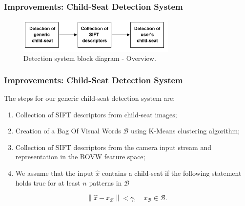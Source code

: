 \documentclass{beamer}
\newcommand{\norm}[1]{\left\lVert#1\right\rVert}
\begin{document}
	\begin{frame}
		\frametitle{Improvements: Child-Seat Detection System}
		\begin{figure}
			\centering
			\includegraphics[width=0.7\textwidth]{img/SIFT_collection.png}
			\caption{Detection system block diagram - Overview.}
		\end{figure}
	\end{frame}

	\begin{frame}
		\frametitle{Improvements: Child-Seat Detection System}
		The steps for our generic child-seat detection system are:
		
		\begin{enumerate}
			\item Collection of SIFT descriptors from child-seat images;
			\item Creation of a Bag Of Visual Words $\mathcal{B}$ using K-Means clustering algorithm;
			\item Collection of SIFT descriptors from the camera input stream and representation in the BOVW feature space;
			\item We assume that the input $\hat{x}$ contains a child-seat if the following statement holds true for at least $n$ patterns in $\mathcal{B}$
		\end{enumerate}
		\begin{equation*}
			\norm{\hat{x} - x_{\mathcal{B}}} < \gamma,
			\quad x_{\mathcal{B}} \in \mathcal{B}.
		\end{equation*}
	\end{frame}
\end{document}
